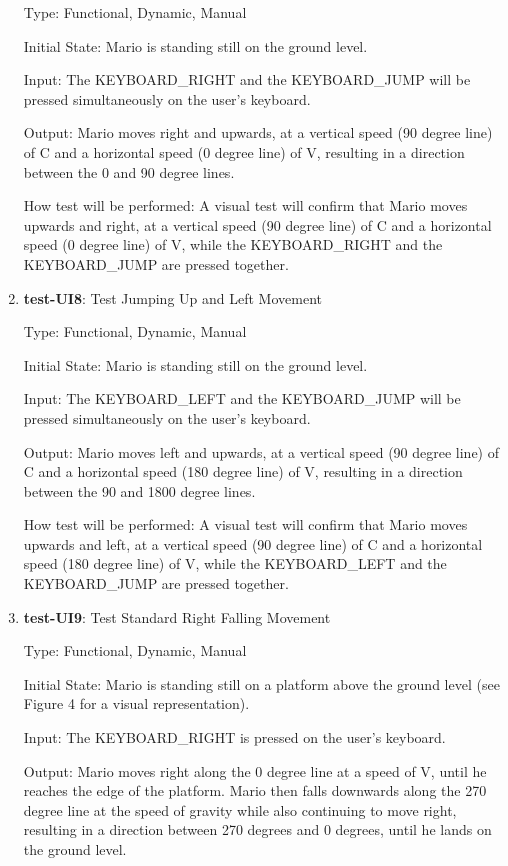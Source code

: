 \documentclass[12pt, titlepage]{article}
\begin{document}
\begin{enumerate}
Type: Functional, Dynamic, Manual
					
Initial State: Mario is standing still on the ground level.
					
Input: The KEYBOARD\_RIGHT and the KEYBOARD\_JUMP will be pressed simultaneously on the user's keyboard.
					
Output: Mario moves right and upwards, at a vertical speed (90 degree line) of C and a horizontal speed (0 degree line) of V, resulting in a direction between the 0 and 90 degree lines.
					
How test will be performed: A visual test will confirm that Mario moves upwards and right, at a vertical speed (90 degree line) of C and a horizontal speed (0 degree line) of V, while the KEYBOARD\_RIGHT and the KEYBOARD\_JUMP are pressed together.

\item{\textbf{test-UI8}: Test Jumping Up and Left Movement\\}

Type: Functional, Dynamic, Manual
					
Initial State: Mario is standing still on the ground level.
					
Input: The KEYBOARD\_LEFT and the KEYBOARD\_JUMP will be pressed simultaneously on the user's keyboard.
					
Output: Mario moves left and upwards, at a vertical speed (90 degree line) of C and a horizontal speed (180 degree line) of V, resulting in a direction between the 90 and 1800 degree lines.
					
How test will be performed: A visual test will confirm that Mario moves upwards and left, at a vertical speed (90 degree line) of C and a horizontal speed (180 degree line) of V, while the KEYBOARD\_LEFT and the KEYBOARD\_JUMP are pressed together.

\item{\textbf{test-UI9}: Test Standard Right Falling Movement\\}

Type: Functional, Dynamic, Manual
					
Initial State: Mario is standing still on a platform above the ground level (see Figure 4 for a visual representation).
					
Input: The KEYBOARD\_RIGHT is pressed on the user's keyboard.
					
Output: Mario moves right along the 0 degree line at a speed of V, until he reaches the edge of the platform. Mario then falls downwards along the 270 degree line at the speed of gravity while also continuing to move right, resulting in a direction between 270 degrees and 0 degrees, until he lands on the ground level.
					

\end{enumerate}
\end{document}

